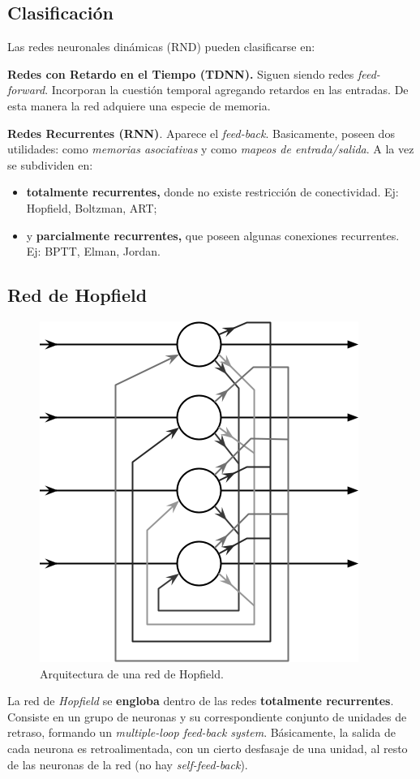 \documentclass[10pt,a4paper]{article}
\begin{document}
\subsection{Clasificación}

Las redes neuronales dinámicas (RND) pueden clasificarse en:
\begin{description}
\item \textbf{Redes con Retardo en el Tiempo (TDNN).} Siguen siendo redes \textit{feed-forward}. Incorporan la cuestión temporal agregando retardos en las entradas. De esta manera la red adquiere una especie de memoria.
\item \textbf{Redes Recurrentes (RNN)}. Aparece el \textit{feed-back}. Basicamente, poseen dos utilidades: como \textit{memorias asociativas} y como \textit{mapeos de entrada/salida}. A la vez se subdividen en:
\begin{itemize}
\item \textbf{totalmente recurrentes,} donde no existe restricción de conectividad. Ej: Hopfield, Boltzman, ART;
\item y \textbf{parcialmente recurrentes,} que poseen algunas conexiones recurrentes. Ej: BPTT, Elman, Jordan.
\end{itemize}
\end{description}

\subsection{Red de Hopfield}

\begin{figure}
  \label{fig:hopfield}
  \caption{Arquitectura de una red de Hopfield.}
  \centering
  \hbox{\includegraphics[width=0.35\textwidth-\fboxrule-\fboxrule]{imgs/hopfield.png}}  
\end{figure}	

La red de \textit{Hopfield} se \textbf{engloba} dentro de las redes \textbf{totalmente recurrentes}. Consiste en un grupo de neuronas y su correspondiente conjunto de unidades de retraso, formando un \textit{multiple-loop feed-back system}. Básicamente, la salida de cada neurona es retroalimentada, con un cierto desfasaje de una unidad, al resto de las neuronas de la red (no hay \textit{self-feed-back}).
\end{document}
